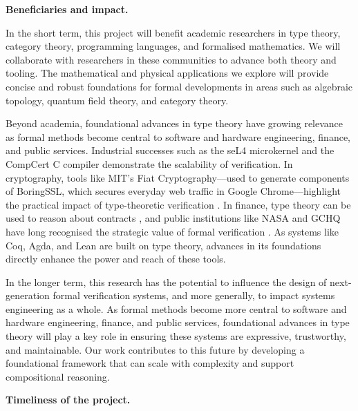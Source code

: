 \documentclass[a4paper,11pt]{article}
\renewcommand{\paragraph}[1]{\textbf{#1.}}
\begin{document}
\paragraph{Beneficiaries and impact}

In the short term, this project will benefit academic researchers in
type theory, category theory, programming languages, and formalised
mathematics. We will collaborate with researchers in these communities
to advance both theory and tooling. The mathematical and physical
applications we explore will provide concise and robust foundations
for formal developments in areas such as algebraic topology, quantum
field theory, and category theory.

Beyond academia, foundational advances in type theory have growing relevance as formal methods become central to software and hardware engineering, finance, and public services. Industrial successes such as the seL4 microkernel \cite{klein2014} and the CompCert C compiler \cite{Leroy2009} demonstrate the scalability of verification. In cryptography, tools like MIT’s Fiat Cryptography—used to generate components of BoringSSL, which secures everyday web traffic in Google Chrome—highlight the practical impact of type-theoretic verification \cite{Chlipala2019}. In finance, type theory can be used to reason about contracts \cite{PeytonJones2000}, and public institutions like NASA and GCHQ have long recognised the strategic value of formal verification \cite{Rushby1993}. As systems like Coq, Agda, and Lean are built on type theory, advances in its foundations directly enhance the power and reach of these tools.

In the longer term, this research has the potential to influence the
design of next-generation formal verification systems, and more
generally, to impact systems engineering as a whole. As formal methods
become more central to software and hardware engineering, finance, and
public services, foundational advances in type theory will play a key
role in ensuring these systems are expressive, trustworthy, and
maintainable. Our work contributes to this future by developing a
foundational framework that can scale with complexity and support
compositional reasoning.

\paragraph{Timeliness of the project}

\end{document}
